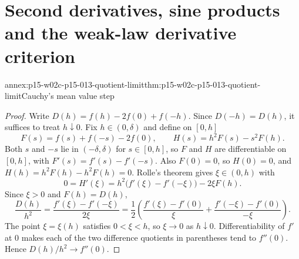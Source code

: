 \section{Second derivatives, sine products and the weak-law derivative criterion}
\label{sec:annex-p15-w02c-p15-013-second-derivatives-and-products}

\begin{annexitem}{annex:p15-w02c-p15-013-quotient-limit}{thm:p15-w02c-p15-013-quotient-limit}{Cauchy's mean value step}
\begin{proof}
Write \(D(h)=f(h)-2f(0)+f(-h)\). Since \(D(-h)=D(h)\), it suffices to treat
\(h\downarrow0\). Fix \(h\in(0,\delta)\) and define on \([0,h]\)
\[
 F(s)=f(s)+f(-s)-2f(0),\qquad
 H(s)=h^2F(s)-s^2F(h).
\]
Both \(s\) and \(-s\) lie in \((-\delta,\delta)\) for \(s\in[0,h]\), so \(F\)
and \(H\) are differentiable on \([0,h]\), with
\(F'(s)=f'(s)-f'(-s)\). Also \(F(0)=0\), so \(H(0)=0\), and
\(H(h)=h^2F(h)-h^2F(h)=0\). Rolle's theorem gives \(\xi\in(0,h)\) with
\[
 0=H'(\xi)=h^2\bigl(f'(\xi)-f'(-\xi)\bigr)-2\xi F(h).
\]
Since \(\xi>0\) and \(F(h)=D(h)\),
\[
 \frac{D(h)}{h^2}=\frac{f'(\xi)-f'(-\xi)}{2\xi}
 =\frac12\left(\frac{f'(\xi)-f'(0)}{\xi}
             +\frac{f'(-\xi)-f'(0)}{-\xi}\right).
\]
The point \(\xi=\xi(h)\) satisfies \(0<\xi<h\), so \(\xi\to0\) as
\(h\downarrow0\). Differentiability of \(f'\) at \(0\) makes each of the two
difference quotients in parentheses tend to \(f''(0)\). Hence
\(D(h)/h^2\to f''(0)\).
\end{proof}
\end{annexitem}

